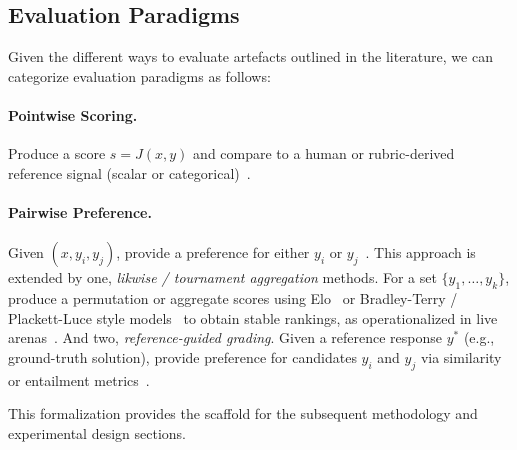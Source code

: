 \subsection{Evaluation Paradigms}
Given the different ways to evaluate artefacts outlined in the literature, we can categorize evaluation paradigms as follows:
\paragraph{Pointwise Scoring.} Produce a score $s = J(x,y)$ and compare to a human or rubric-derived reference signal (scalar or categorical)~\cite{fu2023gptscore, li2024_llmsasjudges}. 
\paragraph{Pairwise Preference.} Given $(x, y_i, y_j)$, provide a preference for either $y_i$ or $y_j$~\cite{zheng2023judgelm}. This approach is extended by one, \emph{likwise / tournament aggregation} methods. For a set $\{y_1,\dots,y_k\}$, produce a permutation or aggregate scores using Elo~\cite{elo1978rating, zheng2023judgelm} or Bradley-Terry / Plackett-Luce style models~\cite{bradley1952rank} to obtain stable rankings, as operationalized in live arenas~\cite{zheng2023judgelm}. And two, \emph{reference-guided grading}. Given a reference response $y^{*}$ (e.g., ground-truth solution), provide preference for candidates $y_i$ and $y_j$ via similarity or entailment metrics~\cite{zheng2023judgelm}.

\vspace{0.5em}
This formalization provides the scaffold for the subsequent methodology and experimental design sections.

